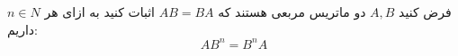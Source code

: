 \begin{PROBLEM}
	\p
	فرض کنید 
	$A, B$
	دو ماتریس مربعی هستند که 
	$AB = BA$
	اثبات کنید به ازای هر 
	$n \in N$
	داریم:
	$$AB^n = B^nA$$
	\SOLUTION{
		\p
		
	}
\end{PROBLEM}